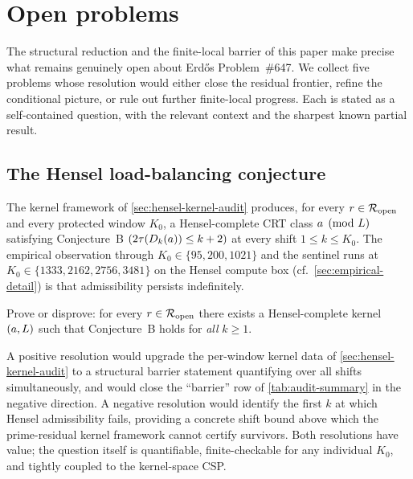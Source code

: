 
\section{Open problems}
\label{sec:open}

The structural reduction and the finite-local barrier of this paper
make precise what remains genuinely open about Erd\H{o}s
Problem~\#647. We collect five problems whose resolution would
either close the residual frontier, refine the conditional picture,
or rule out further finite-local progress. Each is stated as a
self-contained question, with the relevant context and the
sharpest known partial result.

\subsection{The Hensel load-balancing conjecture}
\label{sec:open-hensel-balance}

The kernel framework of \cref{sec:hensel-kernel-audit} produces, for
every $r \in \mathcal{R}_{\mathrm{open}}$ and every protected window $K_0$, a
Hensel-complete CRT class $a \pmod{L}$ satisfying Conjecture~B
$(2 \tau(D_k(a)) \le k + 2)$ at every shift $1 \le k \le K_0$. The
empirical observation through $K_0 \in \{95, 200, 1021\}$ and the
sentinel runs at $K_0 \in \{1333, 2162, 2756, 3481\}$ on the Hensel
compute box (cf.\ \cref{sec:empirical-detail}) is that
admissibility persists indefinitely.

\begin{problem}
\label{prob:hensel-balance}
Prove or disprove: for every $r \in \mathcal{R}_{\mathrm{open}}$ there exists a
Hensel-complete kernel $(a, L)$ such that Conjecture~B holds for
\emph{all} $k \ge 1$.
\end{problem}

A positive resolution would upgrade the per-window kernel data of
\cref{sec:hensel-kernel-audit} to a structural barrier statement
quantifying over all shifts simultaneously, and would close the
``barrier'' row of \cref{tab:audit-summary} in the negative
direction. A negative resolution would identify the first $k$ at
which Hensel admissibility fails, providing a concrete shift bound
above which the prime-residual kernel framework cannot certify
survivors. Both resolutions have value; the question itself is
quantifiable, finite-checkable for any individual $K_0$, and tightly
coupled to the kernel-space CSP.

